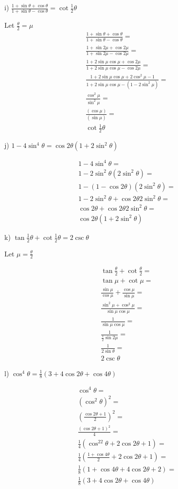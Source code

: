 \documentclass[]{report}
\begin{document}
i) $\frac{1 + \sin\theta + \cos\theta}{1 + \sin\theta - \cos\theta} =\cot\frac{1}{2}\theta$

Let $\frac{\theta}{2} = \mu$
\begin{align*}
\frac{1 + \sin\theta + \cos\theta}{1 + \sin\theta - \cos\theta} = \\
\frac{1 + \sin2\mu + \cos2\mu}{1 + \sin2\mu - \cos2\mu} = \\
\frac{1 + 2\sin\mu\cos\mu + \cos2\mu}{1 + 2\sin\mu\cos\mu - \cos2\mu} = \\
\frac{1 + 2\sin\mu\cos\mu + 2\cos^2\mu - 1}{1 + 2\sin\mu\cos\mu - (1-2\sin^2\mu)} = \\
\frac{ \cos^2\mu}{\sin^2\mu} = \\
\frac{(\cos\mu)}{(\sin\mu)} = \\
\cot\frac{1}{2}\theta
\end{align*}

j) $1 - 4\sin^4\theta = \cos2\theta(1+2\sin^2\theta)$

\begin{align*}
1 - 4\sin^4\theta = \\
1 - 2\sin^2\theta(2\sin^2\theta) = \\
1 - (1 - \cos2\theta)(2\sin^2\theta) = \\
1 - 2\sin^2\theta + \cos2\theta2\sin^2\theta = \\
\cos2\theta+ \cos2\theta2\sin^2\theta = \\
\cos2\theta(1+2\sin^2\theta)
\end{align*}

k) $\tan \frac{1}{2} \theta + \cot\frac{1}{2}\theta = 2\csc\theta$

Let $\mu = \frac{\theta}{2}$

\begin{align*}
\tan \frac{\theta}{2} + \cot\frac{\theta}{2} = \\
\tan \mu + \cot\mu = \\
\frac{\sin\mu}{\cos\mu} + \frac{\cos\mu}{\sin\mu} = \\
\frac{\sin^2\mu + \cos^2\mu}{\sin\mu\cos\mu}  = \\
\frac{1}{\sin\mu\cos\mu}  = \\
\frac{1}{\frac{1}{2}\sin2\mu}  = \\
\frac{1}{2\sin\theta}  = \\
2\csc\theta
\end{align*}

l) $\cos^4\theta =\frac{1}{8}(3 + 4\cos2\theta + \cos4\theta)$

\begin{align*}
	\cos^4\theta = \\
	(\cos^2\theta)^2 = \\
	(\frac{\cos2\theta + 1}{2})^2 = \\
	\frac{(\cos2\theta+1)^2}{4} = \\
	\frac{1}{4} (\cos^22\theta + 2\cos2\theta + 1) = \\
	\frac{1}{4} (\frac{1 + \cos4\theta}{2}+ 2\cos2\theta + 1) = \\
	\frac{1}{8} (1 + \cos4\theta+ 4\cos2\theta + 2) = \\
	\frac{1}{8}(3 + 4\cos2\theta + \cos4\theta)
\end{align*}
\end{document}
